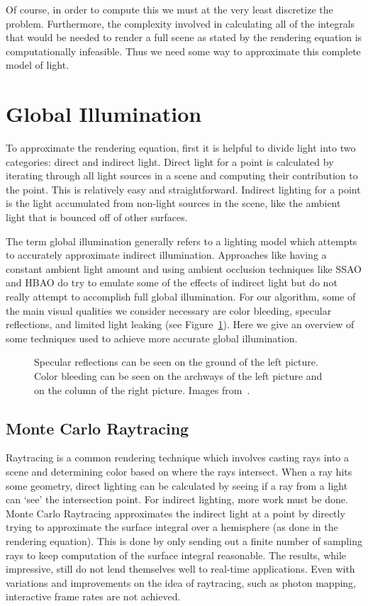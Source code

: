 Of course, in order to compute this we must at the very least discretize the problem. Furthermore, the complexity involved in calculating all of the integrals that would be needed to render a full scene as stated by the rendering equation is computationally infeasible. Thus we need some way to approximate this complete model of light.

\section{Global Illumination}
To approximate the rendering equation, first it is helpful to divide light into two categories: direct and indirect light. Direct light for a point is calculated by iterating through all light sources in a scene and computing their contribution to the point. This is relatively easy and straightforward. Indirect lighting for a point is the light accumulated from non-light sources in the scene, like the ambient light that is bounced off of other surfaces.

The term global illumination generally refers to a lighting model which attempts to accurately approximate indirect illumination. Approaches like having a constant ambient light amount and using ambient occlusion techniques like SSAO and HBAO do try to emulate some of the effects of indirect light but do not really attempt to accomplish full global illumination. For our algorithm, some of the main visual qualities we consider necessary are color bleeding, specular reflections, and limited light leaking (see Figure~\ref{fig:giqualities}). Here we give an overview of some techniques used to achieve more accurate global illumination.

\begin{figure}[h]
\centering
{}
\caption{Specular reflections can be seen on the ground of the left picture. Color bleeding can be seen on the archways of the left picture and on the column of the right picture. Images from~\cite{crassin2011interactive}.}
\label{fig:giqualities}
\end{figure}

\subsection{Monte Carlo Raytracing}
Raytracing is a common rendering technique which involves casting rays into a scene and determining color based on where the rays intersect. When a ray hits some geometry, direct lighting can be calculated by seeing if a ray from a light can `see' the intersection point. For indirect lighting, more work must be done. Monte Carlo Raytracing approximates the indirect light at a point by directly trying to approximate the surface integral over a hemisphere (as done in the rendering equation). This is done by only sending out a finite number of sampling rays to keep computation of the surface integral reasonable. The results, while impressive, still do not lend themselves well to real-time applications. Even with variations and improvements on the idea of raytracing, such as photon mapping, interactive frame rates are not achieved. 

